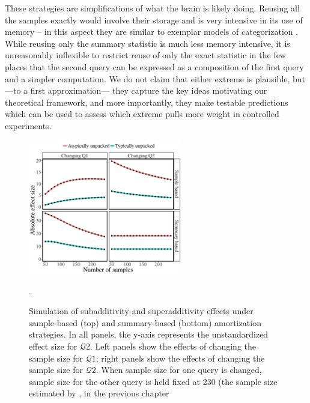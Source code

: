 These strategies are simplifications of what the brain is likely doing. 
Reusing all the samples exactly would involve their storage and is very intensive in its use of memory -- in this aspect they are similar to exemplar models of categorization \citep{nosofsky1986attention,medin1978context}. 
While reusing only the summary statistic is much less memory intensive, it is unreasonably inflexible to restrict reuse of only the exact statistic in the few places that the second query can be expressed as a composition of the first query and a simpler computation. We do not claim that either extreme is plausible, but ---to a first approximation--- they capture the key ideas motivating our theoretical framework, and more importantly, they make testable predictions which can be used to assess which extreme pulls more weight in controlled experiments.

\begin{figure}%
\centering
\includegraphics[width=0.6\textwidth]{figures/changingN.pdf}
\caption{Simulation of subadditivity and superadditivity effects under sample-based (top) and summary-based (bottom) amortization strategies. In all panels, the y-axis represents the unstandardized effect size for $\mathcal{Q}2$. Left panels show the effects of changing the sample size for $\mathcal{Q}1$; right panels show the effects of changing the sample size for $\mathcal{Q}2$. When sample size for one query is changed, sample size for the other query is held fixed at 230 (the sample size estimated by \citet{dasgupta17}, in the previous chapter}.
\label{fig:changeN}
\end{figure}

